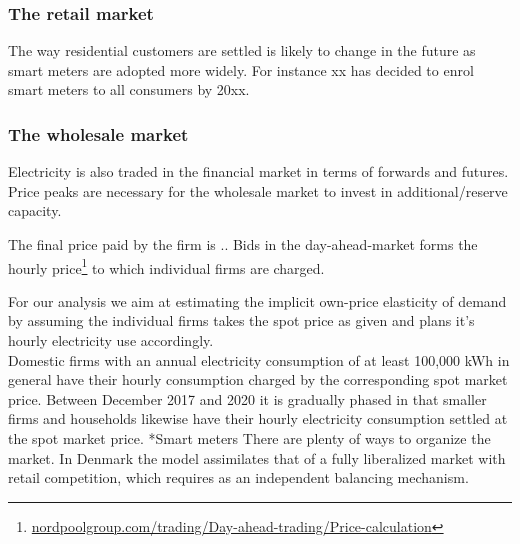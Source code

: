 \subsubsection{The retail market} %
\label{subsubsec: t_resmarket}

The way residential customers are settled is likely to change in the future as smart meters are adopted more widely. For instance xx has decided to enrol smart meters to all consumers by 20xx.  

\subsubsection{The wholesale market}
\label{subsubsec: t_whomarket}

Electricity is also traded in the financial market in terms of forwards and futures. Price peaks are necessary for the wholesale market to invest in additional/reserve capacity. 

 

The final price paid by the firm is .. 
Bids in the day-ahead-market forms the hourly price\footnote{\url{nordpoolgroup.com/trading/Day-ahead-trading/Price-calculation}} to which individual firms are charged. 

For our analysis we aim at estimating the implicit own-price elasticity of demand by assuming the individual firms takes the spot price as given and plans it's hourly electricity use accordingly.
\medskip\\
Domestic firms with an annual electricity consumption of at least 100,000 kWh in general have their hourly consumption charged by the corresponding spot market price. Between December 2017 and 2020 it is gradually phased in that
smaller firms and households likewise have their hourly electricity consumption settled at the spot market price.
*Smart meters
There are plenty of ways to organize the market. In Denmark the model assimilates that of a fully liberalized market with retail competition, which requires as an independent balancing mechanism. 

